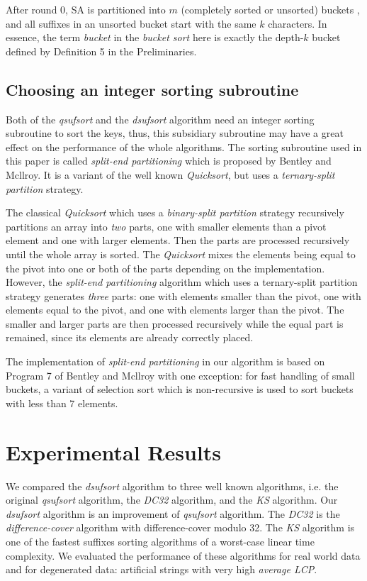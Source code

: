 \documentclass{ws-ijprai}
\begin{document}
After round 0, SA is partitioned into $m$ (completely sorted or
unsorted) buckets , and all suffixes in an unsorted bucket start with
the same $k$ characters. In essence, the term \emph{bucket} in the
\emph{bucket sort} here is exactly the depth-$k$ bucket defined by
Definition 5 in the Preliminaries.

\subsection{Choosing an integer sorting subroutine}

Both of the \emph{qsufsort} and the \emph{dsufsort} algorithm need an
integer sorting subroutine to sort the keys, thus, this subsidiary
subroutine may have a great effect on the performance of the whole
algorithms. The sorting subroutine used in this paper is called
\emph{split-end partitioning} which is proposed by Bentley and
Mcllroy\cite{t_quciksort}. It is a variant of the well known
\emph{Quicksort}\cite{quicksort}, but uses a \emph{ternary-split
partition} strategy.

The classical \emph{Quicksort} which uses a \emph{binary-split
partition} strategy recursively partitions an array into \emph{two}
parts, one with smaller elements than a pivot element and one with
larger elements. Then the parts are processed recursively until the
whole array is sorted. The \emph{Quicksort} mixes the elements being
equal to the pivot into one or both of the parts depending on the
implementation. However, the \emph{split-end partitioning} algorithm
which uses a ternary-split partition strategy generates \emph{three}
parts: one with elements smaller than the pivot, one with elements
equal to the pivot, and one with elements larger than the pivot. The
smaller and larger parts are then processed recursively while the
equal part is remained, since its elements are already correctly
placed.

The implementation of \emph{split-end partitioning} in our algorithm
is based on Program 7 of Bentley and Mcllroy \cite{t_quciksort} with
one exception: for fast handling of small buckets, a variant of
selection sort which is non-recursive is used to sort buckets with
less than 7 elements.


\section{Experimental Results}

We compared the \emph{dsufsort} algorithm to three well known
algorithms, i.e. the original \emph{qsufsort}
algorithm\cite{qsufsort}, the \emph{DC32}\cite{DC32} algorithm, and
the \emph{KS} algorithm\cite{KS}.  Our \emph{dsufsort} algorithm is an
improvement of \emph{qsufsort} algorithm. The \emph{DC32} is the
\emph{difference-cover} algorithm with difference-cover modulo 32.
The \emph{KS} algorithm is one of the fastest suffixes sorting
algorithms of a worst-case linear time complexity. We evaluated the
performance of these algorithms for real world data and for
degenerated data: artificial strings with very high \emph{average
LCP}.
\end{document}
